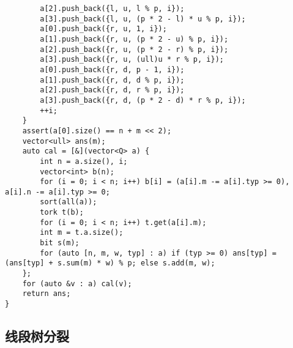 \documentclass[12pt]{ctexart}
\begin{document}
\begin{lstlisting}
		a[2].push_back({l, u, l % p, i});
		a[3].push_back({l, u, (p * 2 - l) * u % p, i});
		a[0].push_back({r, u, 1, i});
		a[1].push_back({r, u, (p * 2 - u) % p, i});
		a[2].push_back({r, u, (p * 2 - r) % p, i});
		a[3].push_back({r, u, (ull)u * r % p, i});
		a[0].push_back({r, d, p - 1, i});
		a[1].push_back({r, d, d % p, i});
		a[2].push_back({r, d, r % p, i});
		a[3].push_back({r, d, (p * 2 - d) * r % p, i});
		++i;
	}
	assert(a[0].size() == n + m << 2);
	vector<ull> ans(m);
	auto cal = [&](vector<Q> a) {
		int n = a.size(), i;
		vector<int> b(n);
		for (i = 0; i < n; i++) b[i] = (a[i].m -= a[i].typ >= 0), a[i].n -= a[i].typ >= 0;
		sort(all(a));
		tork t(b);
		for (i = 0; i < n; i++) t.get(a[i].m);
		int m = t.a.size();
		bit s(m);
		for (auto [n, m, w, typ] : a) if (typ >= 0) ans[typ] = (ans[typ] + s.sum(m) * w) % p; else s.add(m, w);
	};
	for (auto &v : a) cal(v);
	return ans;
}
\end{lstlisting}

\subsection{线段树分裂}
\end{document}
